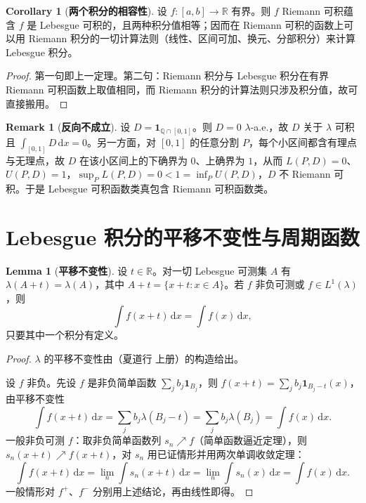 \documentclass[oneside]{book}
\theoremstyle{definition}
\newcommand{\R}{\mathbb{R}}
\newcommand{\dd}{\mathrm{d}}
\providecommand{\Q}{\mathbb{Q}}
\theoremstyle{definition}
\newtheorem{corollary}{Corollary}[section]
\newtheorem{remark}{Remark}[section]
\newtheorem{lemma}{Lemma}[section]
\begin{document}
	\begin{corollary}[\bfseries{两个积分的相容性}]
		设 $f:[a,b]\to\R$ 有界。则 $f$ Riemann 可积蕴含 $f$ 是 Lebesgue 可积的，且两种积分值相等；因而在 Riemann 可积的函数上可以用 Riemann 积分的一切计算法则（线性、区间可加、换元、分部积分）来计算 Lebesgue 积分。
	\end{corollary}
	
	\begin{proof}
		第一句即上一定理。第二句：Riemann 积分与 Lebesgue 积分在有界 Riemann 可积函数上取值相同，而 Riemann 积分的计算法则只涉及积分值，故可直接搬用。
	\end{proof}
	
	\begin{remark}[\bfseries{反向不成立}]
		设 $D=\mathbf{1}_{\Q\cap[0,1]}$。则 $D=0$ $\lambda$-a.e.，故 $D$ 关于 $\lambda$ 可积且 $\int_{[0,1]}D\,\dd x=0$。另一方面，对 $[0,1]$ 的任意分割 $P$，每个小区间都含有理点与无理点，故 $D$ 在该小区间上的下确界为 $0$、上确界为 $1$，从而 $L(P,D)=0$、$U(P,D)=1$，$\sup_P L(P,D)=0<1=\inf_P U(P,D)$，$D$ 不 Riemann 可积。于是 Lebesgue 可积函数类真包含 Riemann 可积函数类。
	\end{remark}
	
	\section{Lebesgue 积分的平移不变性与周期函数}
	
	\begin{lemma}[\bfseries{平移不变性}]
		设 $t\in\R$。对一切 Lebesgue 可测集 $A$ 有 $\lambda(A+t)=\lambda(A)$，其中 $A+t=\{x+t:x\in A\}$。若 $f$ 非负可测或 $f\in L^{1}(\lambda)$，则
		\[
		\int f(x+t)\,\dd x=\int f(x)\,\dd x ,
		\]
		只要其中一个积分有定义。
	\end{lemma}
	
	\begin{proof}
		$\lambda$ 的平移不变性由（夏道行 上册）的构造给出。
		
		设 $f$ 非负。先设 $f$ 是非负简单函数 $\sum_j b_j\mathbf{1}_{B_j}$，则 $f(x+t)=\sum_j b_j\mathbf{1}_{B_j-t}(x)$，由平移不变性
		\[
		\int f(x+t)\,\dd x=\sum_j b_j\lambda(B_j-t)=\sum_j b_j\lambda(B_j)=\int f(x)\,\dd x .
		\]
		一般非负可测 $f$：取非负简单函数列 $s_n\nearrow f$（简单函数逼近定理），则 $s_n(x+t)\nearrow f(x+t)$，对 $s_n$ 用已证情形并用两次单调收敛定理：
		\[
		\int f(x+t)\,\dd x=\lim_n\int s_n(x+t)\,\dd x=\lim_n\int s_n(x)\,\dd x=\int f(x)\,\dd x .
		\]
		一般情形对 $f^{+}$、$f^{-}$ 分别用上述结论，再由线性即得。
	\end{proof}
	
\end{document}
